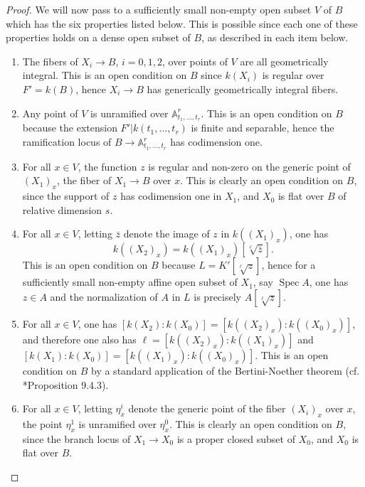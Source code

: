 \documentclass[11pt]{amsart}
\theoremstyle{definition}
\theoremstyle{remark}
\numberwithin{equation}{section}
\DeclareMathOperator{\Spec}{Spec}
\newcommand{\Abb}{\mathbb{A}}
\begin{document}
\begin{proof}
  We will now pass to a sufficiently small non-empty open subset $V$ of $B$ which has the six properties listed below.
  This is possible since each one of these properties holds on a dense open subset of $B$, as described in each item below.
  \begin{enumerate}[leftmargin=*]
    \item The fibers of $X_i \rightarrow B$, $i = 0,1,2$, over points of $V$ are all geometrically integral.
    This is an open condition on $B$ since $k(X_i)$ is regular over $F' = k(B)$, hence $X_i \rightarrow B$ has generically geometrically integral fibers.
    \item Any point of $V$ is unramified over $\Abb^r_{t_1,\ldots,t_r}$.
    This is an open condition on $B$ because the extension $F'|k(t_1,\ldots,t_r)$ is finite and separable, hence the ramification locus of $B \rightarrow \Abb^r_{t_1,\ldots,t_r}$ has codimension one.
    \item For all $x \in V$, the function $z$ is regular and non-zero on the generic point of $(X_1)_x$, the fiber of $X_1 \rightarrow B$ over $x$.
    This is clearly an open condition on $B$, since the support of $z$ has codimension one in $X_1$, and $X_0$ is flat over $B$ of relative dimension $s$.
    \item For all $x \in V$, letting $\bar z$ denote the image of $z$ in $k((X_1)_x)$, one has
    \[ k((X_2)_x) = k((X_1)_x)[\sqrt[\ell]{\bar z}]. \]
    This is an open condition on $B$ because $L = K'[\sqrt[\ell]{z}]$, hence for a sufficiently small non-empty affine open subset of $X_1$, say $\Spec A$, one has $z \in A$ and the normalization of $A$ in $L$ is precisely $A[\sqrt[\ell]{z}]$.
    \item For all $x \in V$, one has $[k(X_2):k(X_0)] = [k((X_2)_x):k((X_0)_x)]$, and therefore one also has $\ell = [k((X_2)_x):k((X_1)_x)]$ and $[k(X_1):k(X_0)] = [k((X_1)_x):k((X_0)_x)]$.
    This is an open condition on $B$ by a standard application of the Bertini-Noether theorem (cf. \cite{Fried:2006}*{Proposition 9.4.3}).
    \item For all $x \in V$, letting $\eta^i_x$ denote the generic point of the fiber $(X_i)_x$ over $x$, the point $\eta^1_x$ is unramified over $\eta^0_x$.
    This is clearly an open condition on $B$, since the branch locus of $X_1 \rightarrow X_0$ is a proper closed subset of $X_0$, and $X_0$ is flat over $B$.
  \end{enumerate}


\end{proof}
\end{document}
